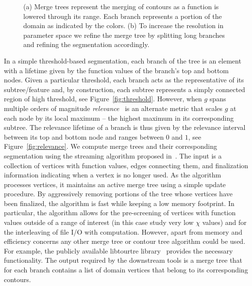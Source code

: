 \begin{figure}[htbp]
  \centering
  \caption{(a) Merge trees represent the merging of contours as a function is lowered through its range. 
    Each branch represents a portion of the domain as indicated by the colors. (b) To increase the 
      resolution in parameter space we refine the merge tree by splitting long branches and refining 
      the segmentation accordingly.}
\end{figure}

In a simple threshold-based segmentation, each branch of the tree is an element
with a lifetime given by the function values of the branch's top and bottom
nodes. Given a particular threshold, each branch acts as the representative of
its subtree/feature and, by construction, each subtree represents a simply
connected region of high threshold, see Figure~\ref{fig:threshold}. However,
when $g$ spans multiple orders of magnitude {\it relevance}~\cite{Mascarenhas09}
is an alternate metric that scales $g$ at each node by its local maximum --
the highest maximum in its corresponding subtree. The relevance lifetime of a
branch is thus given by the relevance interval between its top and bottom node
and ranges between $0$ and $1$, see Figure~\ref{fig:relevance}. We compute merge
trees and their corresponding segmentation using the streaming algorithm
proposed in~\cite{Bremer10tvcg}. The input is a collection of vertices with
  function values, edges connecting them, and finalization information
  indicating when a vertex is no longer used. As the algorithm processes vertices, it
  maintains an active merge tree using a simple update procedure. By
  aggressively removing portions of the tree whose vertices have been finalized, the algorithm is
  fast while keeping a low memory footprint. In particular, the algorithm allows
  for the pre-screening of vertices with function values outside of a range of
  interest (in this case study very low $\chi$ values) and for the interleaving of file I/O with
  computation. However, apart from memory and efficiency concerns any other
  merge tree or contour tree algorithm could be used. For example, the publicly
  available libtourtre library~\cite{libtourtre} provides the necessary
  functionality. The output required by the downstream tools is a merge tree that for
  each branch contains a list of domain vertices that belong to its corresponding 
  contours. 


